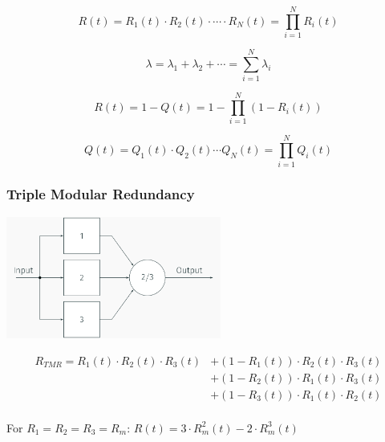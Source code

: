 \documentclass[
  10pt,
  a4paper,
  twocolumn]{article}
\begin{document}
\begin{center}

\end{center}

\[
R(t)=R_1(t)\cdot R_2(t)\cdot\cdots\cdot R_N(t)=\prod_{i=1}^N R_i(t)
\]

\[
\lambda=\lambda_1+\lambda_2+\cdots=\sum_{i=1}^N \lambda_i
\]

\begin{center}

\end{center}

\[
R(t)=1-Q(t)=1-\prod_{i=1}^N(1-R_i(t))
\]

\[
Q(t)=Q_1(t)\cdot Q_2(t)\cdots Q_N(t)=\prod_{i=1}^N Q_i(t)
\]

\subsubsection{Triple Modular
Redundancy}\label{triple-modular-redundancy}

\begin{center}
\includegraphics[width=\textwidth,height=4cm]{images/safety/image-11.png}
\end{center}

\[
\begin{split}
R_{TMR}=R_1(t)\cdot R_2(t)\cdot R_3(t) &+ (1-R_1(t))\cdot R_2(t)\cdot R_3(t)\\
                                       &+ (1-R_2(t))\cdot R_1(t)\cdot R_3(t)\\
                                       &+ (1-R_3(t))\cdot R_1(t)\cdot R_2(t)\\
\end{split}
\]

For \(R_1=R_2=R_3=R_m\): \(R(t)=3\cdot R_m^2(t)-2\cdot R_m^3(t)\)
\end{document}
